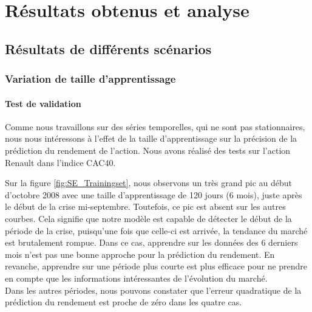 
\section{Résultats obtenus et analyse}
 
\subsection{Résultats de différents scénarios}

\subsubsection{Variation de taille d'apprentissage}

\paragraph{Test de validation}
Comme nous travaillons sur des séries temporelles, qui ne sont pas stationnaires, nous nous intéressons à l'effet de la taille d'apprentissage sur la précision de la prédiction du rendement de l'action. Nous avons réalisé des tests sur l'action Renault dans l'indice CAC40.

Sur la figure \ref{fig:SE_Trainingset}, nous observons un très grand pic au début d'octobre 2008 avec une taille d'apprentissage de 120 jours (6 mois), juste après le début de la crise mi-septembre. Toutefois, ce pic est absent sur les autres courbes. Cela signifie que notre modèle est capable de détecter le début de la période de la crise, puisqu'une fois que celle-ci est arrivée, la tendance du marché est brutalement rompue. Dans ce cas, apprendre sur les données des 6 derniers mois n'est pas une bonne approche pour la prédiction du rendement. En revanche, apprendre sur une période plus courte est plus efficace pour ne prendre en compte que les informations intéressantes de l'évolution du marché.\\

Dans les autres périodes, nous pouvons constater que l'erreur quadratique de la prédiction du rendement est proche de zéro dans les quatre cas.

